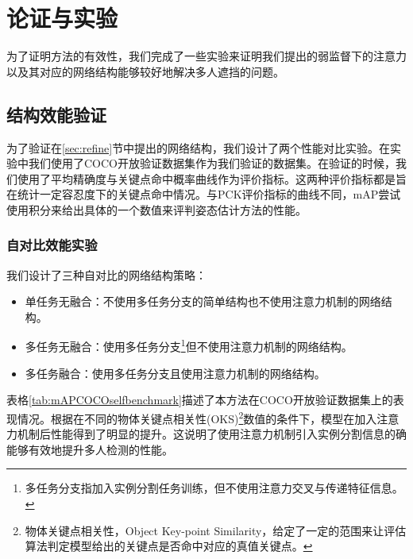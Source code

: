 \chapter{论证与实验}
\label{cha:exp}
为了证明方法的有效性，我们完成了一些实验来证明我们提出的弱监督下的注意力以及其对应的网络结构能够较好地解决多人遮挡的问题。
\section{结构效能验证}
\label{sec:ablation}
为了验证在\ref{sec:refine}节中提出的网络结构，我们设计了两个性能对比实验。在实验中我们使用了COCO开放验证数据集\cite{lin2014microsoft}作为我们验证的数据集。在验证的时候，我们使用了平均精确度与关键点命中概率曲线\cite{andriluka20142d}作为评价指标。这两种评价指标都是旨在统计一定容忍度下的关键点命中情况。与PCK评价指标的曲线不同，mAP尝试使用积分来给出具体的一个数值来评判姿态估计方法的性能。
\subsection{自对比效能实验}
\label{subsec:selfeval}
我们设计了三种自对比的网络结构策略：
\begin{itemize}
	\item 单任务无融合：不使用多任务分支的简单结构也不使用注意力机制的网络结构。
	\item 多任务无融合：使用多任务分支\footnote{多任务分支指加入实例分割任务训练，但不使用注意力交叉与传递特征信息。}但不使用注意力机制的网络结构。
	\item 多任务融合：使用多任务分支且使用注意力机制的网络结构。
\end{itemize}

表格\ref{tab:mAPCOCOselfbenchmark}描述了本方法在COCO开放验证数据集上的表现情况。根据在不同的物体关键点相关性(OKS)\footnote{物体关键点相关性，Object Key-point Similarity，给定了一定的范围来让评估算法判定模型给出的关键点是否命中对应的真值关键点。}数值的条件下，模型在加入注意力机制后性能得到了明显的提升。这说明了使用注意力机制引入实例分割信息的确能够有效地提升多人检测的性能。

